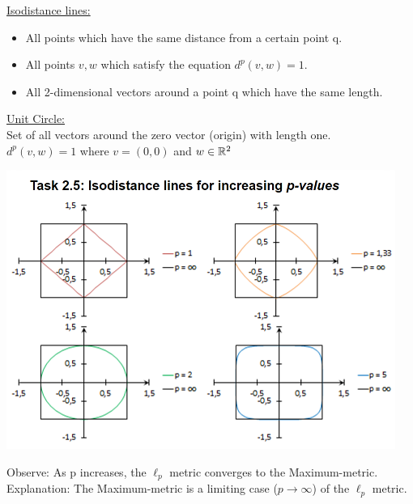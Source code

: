 \begin{enumerate}
\begin{solution}
 	\uline{Isodistance lines:}
		\begin{itemize}
			\item All points which have the same distance from a certain point q.
			\item All points $v,w$ which satisfy the equation $d^p(v,w)=1$.
			\item All 2-dimensional vectors around a point q which have the same length.
		\end{itemize}
	\uline{Unit Circle:}\\
	Set of all vectors around the zero vector (origin) with length one.\\
	$d^p(v,w)=1$	where	$v = (0,0)$ and $w \in \mathbb{R}^2$
	\begin{center}
		\includegraphics[scale=0.7]{Uebungen/figures/isodistantlines}\\
	\end{center}
	Observe: As p increases, the $\ell_p$ metric converges to the Maximum-metric.
	Explanation: The Maximum-metric is a limiting case ($p\rightarrow\infty$) of the $\ell_p$ metric.
 \end{solution}
\end{enumerate}
